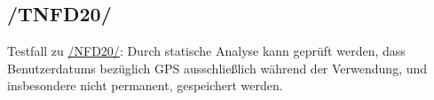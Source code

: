 \subsection*{/TNFD20/}
\label{/TNFD20/} Testfall zu \hyperref[/NFD20/]{/NFD20/}: Durch \gls{statische Analyse} kann geprüft werden, dass \Glspl{Benutzerdatum} bezüglich \Gls{GPS} ausschließlich während der Verwendung, und insbesondere nicht permanent, gespeichert werden.